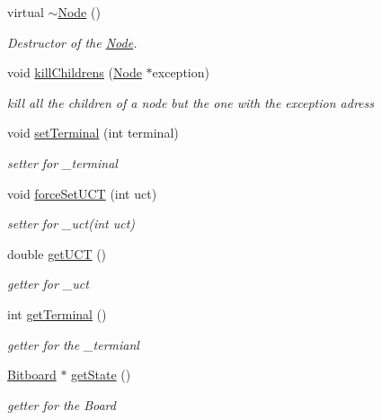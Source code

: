 \begin{DoxyCompactItemize}
\item 
virtual \hyperlink{classmcts_1_1_node_acc91ea418dba8fa979b276e7d0a3af58}{$\sim$\+Node} ()
\begin{DoxyCompactList}\small\item\em Destructor of the \hyperlink{classmcts_1_1_node}{Node}. \end{DoxyCompactList}\item 
void \hyperlink{classmcts_1_1_node_ac01b59cb23a9cbbf0ccd710f42ac5c71}{kill\+Childrens} (\hyperlink{classmcts_1_1_node}{Node} $\ast$exception)
\begin{DoxyCompactList}\small\item\em kill all the children of a node but the one with the exception adress \end{DoxyCompactList}\item 
void \hyperlink{classmcts_1_1_node_acaeef5a74238b304834bacdba95ce46f}{set\+Terminal} (int terminal)
\begin{DoxyCompactList}\small\item\em setter for \+\_\+terminal \end{DoxyCompactList}\item 
void \hyperlink{classmcts_1_1_node_aa4e75d679f31d3f687342429892ab8ab}{force\+Set\+U\+C\+T} (int uct)
\begin{DoxyCompactList}\small\item\em setter for \+\_\+uct(int uct) \end{DoxyCompactList}\item 
double \hyperlink{classmcts_1_1_node_a377005472dee187c715f64ec12f1697c}{get\+U\+C\+T} ()
\begin{DoxyCompactList}\small\item\em getter for \+\_\+uct \end{DoxyCompactList}\item 
int \hyperlink{classmcts_1_1_node_abdae55b6017c6f223b63d2fa193c4420}{get\+Terminal} ()
\begin{DoxyCompactList}\small\item\em getter for the \+\_\+termianl \end{DoxyCompactList}\item 
\hyperlink{class_bitboard}{Bitboard} $\ast$ \hyperlink{classmcts_1_1_node_af2170e0b8de1be9228666b8ef54681f8}{get\+State} ()
\begin{DoxyCompactList}\small\item\em getter for the Board \end{DoxyCompactList}\item 

\end{DoxyCompactItemize}
